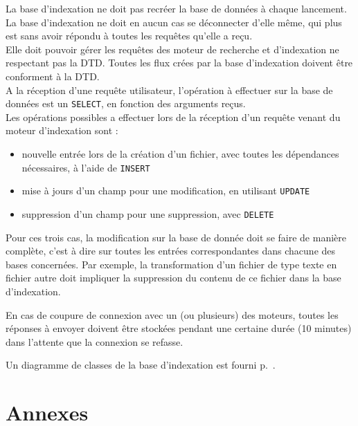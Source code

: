 \documentclass[a4paper,12pt]{report}
\begin{document}
La base d'indexation ne doit pas recréer la base de données à chaque lancement.\\
La base d'indexation ne doit en aucun cas se déconnecter d'elle même, qui plus est sans avoir répondu à toutes les requêtes qu'elle a reçu.\\
Elle doit pouvoir gérer les requêtes des moteur de recherche et d'indexation ne respectant pas la DTD. Toutes les flux crées par la base d'indexation doivent être conforment à la DTD.\\
A la réception d'une requête utilisateur, l'opération à effectuer sur la base de données est un \verb"SELECT", en fonction des arguments reçus.\\
Les opérations possibles a effectuer lors de la réception d'un requête venant du moteur d'indexation sont :
\begin{itemize}
\item nouvelle entrée lors de la création d'un fichier, avec toutes les dépendances nécessaires, à l'aide de \verb"INSERT"
\item mise à jours d'un champ pour une modification, en utilisant \verb"UPDATE"
\item suppression d'un champ pour une suppression, avec \verb"DELETE"
\end{itemize}
Pour ces trois cas, la modification sur la base de donnée doit se faire de manière complète, c'est à dire sur toutes les entrées correspondantes dans chacune des bases concernées. Par exemple, la transformation d'un fichier de type texte en fichier autre doit impliquer la suppression du contenu de ce fichier dans la base d'indexation.

En cas de coupure de connexion avec un (ou plusieurs) des moteurs, toutes les réponses à envoyer doivent être stockées pendant une certaine durée (10 minutes) dans l'attente que la connexion se refasse.

Un diagramme de classes de la base d'indexation est fourni p.~\pageref{diagramme_classes_bi}.

\chapter{Annexes}
\end{document}
